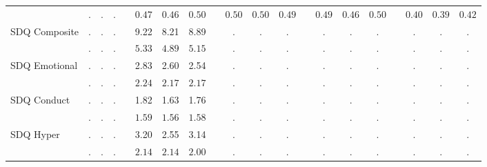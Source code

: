 \begin{center}
{\begin{longtable}{L{5cm} c c c p{.5cm} c c c p{.5cm} c c c p{.5cm} c c c p{.5cm} c c c}
& $\mathit{        .}$ & $\mathit{        .}$ & $\mathit{        .}$ & & $\mathit{     0.47}$ & $\mathit{     0.46}$ & $\mathit{     0.50}$ & & $\mathit{     0.50}$ & $\mathit{     0.50}$ & $\mathit{     0.49}$ & & $\mathit{     0.49}$ & $\mathit{     0.46}$ & $\mathit{     0.50}$ & & $\mathit{     0.40}$ & $\mathit{     0.39}$ & $\mathit{     0.42}$ \\[.7em]
SDQ Composite & . &         . &         . & &      9.22 &      8.21 &      8.89 & &         . &         . &         . & &         . &         . &         . & &         . &         . &         . \\*
& $\mathit{        .}$ & $\mathit{        .}$ & $\mathit{        .}$ & & $\mathit{     5.33}$ & $\mathit{     4.89}$ & $\mathit{     5.15}$ & & $\mathit{        .}$ & $\mathit{        .}$ & $\mathit{        .}$ & & $\mathit{        .}$ & $\mathit{        .}$ & $\mathit{        .}$ & & $\mathit{        .}$ & $\mathit{        .}$ & $\mathit{        .}$ \\[.7em]
SDQ Emotional & . &         . &         . & &      2.83 &      2.60 &      2.54 & &         . &         . &         . & &         . &         . &         . & &         . &         . &         . \\*
& $\mathit{        .}$ & $\mathit{        .}$ & $\mathit{        .}$ & & $\mathit{     2.24}$ & $\mathit{     2.17}$ & $\mathit{     2.17}$ & & $\mathit{        .}$ & $\mathit{        .}$ & $\mathit{        .}$ & & $\mathit{        .}$ & $\mathit{        .}$ & $\mathit{        .}$ & & $\mathit{        .}$ & $\mathit{        .}$ & $\mathit{        .}$ \\[.7em]
SDQ Conduct & . &         . &         . & &      1.82 &      1.63 &      1.76 & &         . &         . &         . & &         . &         . &         . & &         . &         . &         . \\*
& $\mathit{        .}$ & $\mathit{        .}$ & $\mathit{        .}$ & & $\mathit{     1.59}$ & $\mathit{     1.56}$ & $\mathit{     1.58}$ & & $\mathit{        .}$ & $\mathit{        .}$ & $\mathit{        .}$ & & $\mathit{        .}$ & $\mathit{        .}$ & $\mathit{        .}$ & & $\mathit{        .}$ & $\mathit{        .}$ & $\mathit{        .}$ \\[.7em]
SDQ Hyper & . &         . &         . & &      3.20 &      2.55 &      3.14 & &         . &         . &         . & &         . &         . &         . & &         . &         . &         . \\*
& $\mathit{        .}$ & $\mathit{        .}$ & $\mathit{        .}$ & & $\mathit{     2.14}$ & $\mathit{     2.14}$ & $\mathit{     2.00}$ & & $\mathit{        .}$ & $\mathit{        .}$ & $\mathit{        .}$ & & $\mathit{        .}$ & $\mathit{        .}$ & $\mathit{        .}$ & & $\mathit{        .}$ & $\mathit{        .}$ & $\mathit{        .}$ \\[.7em]

\end{longtable}}
\end{center}

